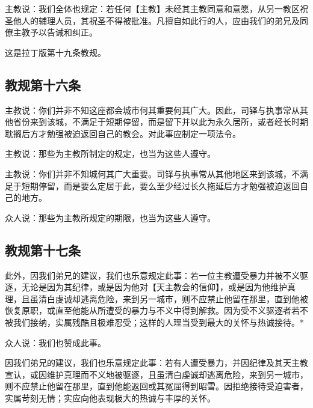 主教说：我们全体也规定：若任何【主教】未经其主教同意和意愿，从另一教区祝圣他人的辅理人员，其祝圣不得被批准。凡擅自如此行的人，应由我们的弟兄及同僚主教予以告诫和纠正。\par

这是拉丁版第十九条教规。\par


\subsection{教规第十六条}

主教说：你们并非不知这座都会城市何其重要何其广大。因此，司铎与执事常从其他省份来到该城，不满足于短期停留，而是留下并以此为永久居所，或者经长时期耽搁后方才勉强被迫返回自己的教会。对此事应制定一项法令。\par

主教说：那些为主教所制定的规定，也当为这些人遵守。\par

主教说：你们并非不知城何其广大重要。司铎与执事常从其他地区来到该城，不满足于短期停留，而是要么定居于此，要么至少经过长久拖延后方才勉强被迫返回自己的地方。\par

众人说：那些为主教所规定的期限，也当为这些人遵守。\par


\subsection{教规第十七条}

此外，因我们弟兄的建议，我们也乐意规定此事：若一位主教遭受暴力并被不义驱逐，无论是因为其纪律，或是因为他对【天主教会的信仰】，或是因为他维护真理，且虽清白虔诚却逃离危险，来到另一城市，则不应禁止他留在那里，直到他被恢复原职，或直至他能从所遭受的暴力与不义中得到解救。因为受不义驱逐者若不被我们接纳，实属残酷且极难忍受；这样的人理当受到最大的关怀与热诚接待。*\par

众人说：我们也赞成此事。\par

因我们弟兄的建议，我们也乐意规定此事：若有人遭受暴力，并因纪律及其天主教宣认，或因维护真理而不义地被驱逐，且虽清白虔诚却逃离危险，来到另一城市，则不应禁止他留在那里，直到他能返回或其冤屈得到昭雪。因拒绝接待受迫害者，实属苛刻无情；实应向他表现极大的热诚与丰厚的关怀。\par

